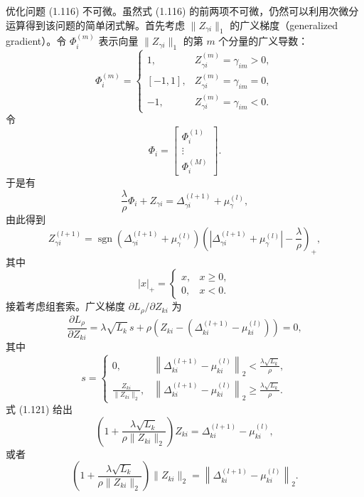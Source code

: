 优化问题 (1.116) 不可微。虽然式 (1.116) 的前两项不可微，仍然可以利用次微分运算得到该问题的简单闭式解。首先考虑 $\|Z_{\gamma i}\|_1$ 的广义梯度（generalized gradient）。令 $\Phi_i^{(m)}$ 表示向量 $\|Z_{\gamma i}\|_1$ 的第 $m$ 个分量的广义导数：
\[
\Phi_i^{(m)}=
\begin{cases}
1,&Z_{\gamma i}^{(m)}=\gamma_{im}>0,\\
[-1,1],&Z_{\gamma i}^{(m)}=\gamma_{im}=0,\\
-1,&Z_{\gamma i}^{(m)}=\gamma_{im}<0.
\end{cases}
\]
令
\[
\Phi_i=\begin{bmatrix}\Phi_i^{(1)}\\\vdots\\\Phi_i^{(M)}\end{bmatrix}.
\]
于是有
\[
\frac{\lambda}{\rho}\Phi_i+Z_{\gamma i}
=\Delta_{\gamma i}^{(l+1)}+\mu_\gamma^{(l)},
\]
由此得到
\begin{equation}
Z_{\gamma i}^{(l+1)}
=\operatorname{sgn}\left(\Delta_{\gamma i}^{(l+1)}+\mu_\gamma^{(l)}\right)
\left(\left|\Delta_{\gamma i}^{(l+1)}+\mu_\gamma^{(l)}\right|
 -\frac{\lambda}{\rho}\right)_+,
\tag{1.120}
\end{equation}
其中
\[
|x|_+=\begin{cases}x,&x\geq0,\\0,&x<0.\end{cases}
\]
接着考虑组套索。广义梯度 $\partial L_\rho/\partial Z_{ki}$ 为
\begin{equation}
\frac{\partial L_\rho}{\partial Z_{ki}}
=\lambda\sqrt{L_k}\,s+
\rho\left(Z_{ki}-\left(\Delta_{ki}^{(l+1)}-\mu_{ki}^{(l)}\right)\right)=0,
\tag{1.121}
\end{equation}
其中
\[
s=
\begin{cases}
0,&\displaystyle
\left\|\Delta_{ki}^{(l+1)}-\mu_{ki}^{(l)}\right\|_2
 <\frac{\lambda\sqrt{L_k}}{\rho},\\[6pt]
\displaystyle\frac{Z_{ki}}{\|Z_{ki}\|_2},&
\displaystyle
\left\|\Delta_{ki}^{(l+1)}-\mu_{ki}^{(l)}\right\|_2
 \geq\frac{\lambda\sqrt{L_k}}{\rho}.
\end{cases}
\]
式 (1.121) 给出
\begin{equation}
\left(1+\frac{\lambda\sqrt{L_k}}{\rho\|Z_{ki}\|_2}\right)Z_{ki}
=\Delta_{ki}^{(l+1)}-\mu_{ki}^{(l)},
\tag{1.122}
\end{equation}
或者
\begin{equation}
\left(1+\frac{\lambda\sqrt{L_k}}{\rho\|Z_{ki}\|_2}\right)\|Z_{ki}\|_2
=\left\|\Delta_{ki}^{(l+1)}-\mu_{ki}^{(l)}\right\|_2.
\tag{1.123}
\end{equation}
